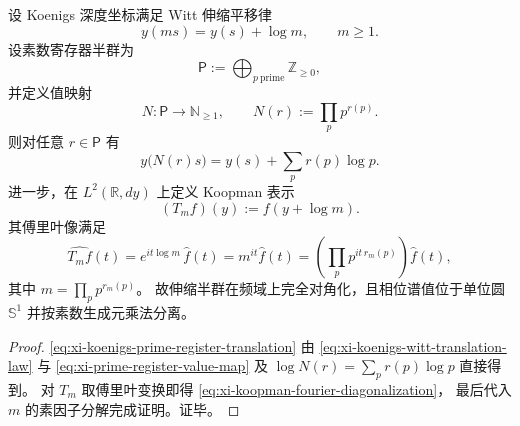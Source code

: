 \begin{proposition}\label{prop:xi-koenigs-prime-generator-spectral-factorization}
设 Koenigs 深度坐标满足 Witt 伸缩平移律
\begin{equation}\label{eq:xi-koenigs-witt-translation-law}
y(ms)=y(s)+\log m,\qquad m\ge 1.
\end{equation}
设素数寄存器半群为
\[
\mathsf P:=\bigoplus_{p\ \mathrm{prime}}\mathbb Z_{\ge 0},
\]
并定义值映射
\begin{equation}\label{eq:xi-prime-register-value-map}
N:\mathsf P\to\mathbb N_{\ge 1},
\qquad
N(r):=\prod_{p}p^{r(p)}.
\end{equation}
则对任意 \(r\in\mathsf P\) 有
\begin{equation}\label{eq:xi-koenigs-prime-register-translation}
y\!\bigl(N(r)s\bigr)
=
y(s)+\sum_{p}r(p)\log p.
\end{equation}
进一步，在 \(L^2(\mathbb R,dy)\) 上定义 Koopman 表示
\[
(T_m f)(y):=f(y+\log m).
\]
其傅里叶像满足
\begin{equation}\label{eq:xi-koopman-fourier-diagonalization}
\widehat{T_m f}(t)=e^{it\log m}\,\widehat f(t)
=m^{it}\widehat f(t)
=\left(\prod_{p}p^{it\,r_m(p)}\right)\widehat f(t),
\end{equation}
其中 \(m=\prod_p p^{r_m(p)}\)。
故伸缩半群在频域上完全对角化，且相位谱值位于单位圆 \(\mathbb S^1\) 并按素数生成元乘法分离。
\end{proposition}
\begin{proof}
\eqref{eq:xi-koenigs-prime-register-translation}
由
\eqref{eq:xi-koenigs-witt-translation-law}
与
\eqref{eq:xi-prime-register-value-map}
及
\(
\log N(r)=\sum_p r(p)\log p
\)
直接得到。
对 \(T_m\) 取傅里叶变换即得
\eqref{eq:xi-koopman-fourier-diagonalization}，
最后代入 \(m\) 的素因子分解完成证明。证毕。
\end{proof}

